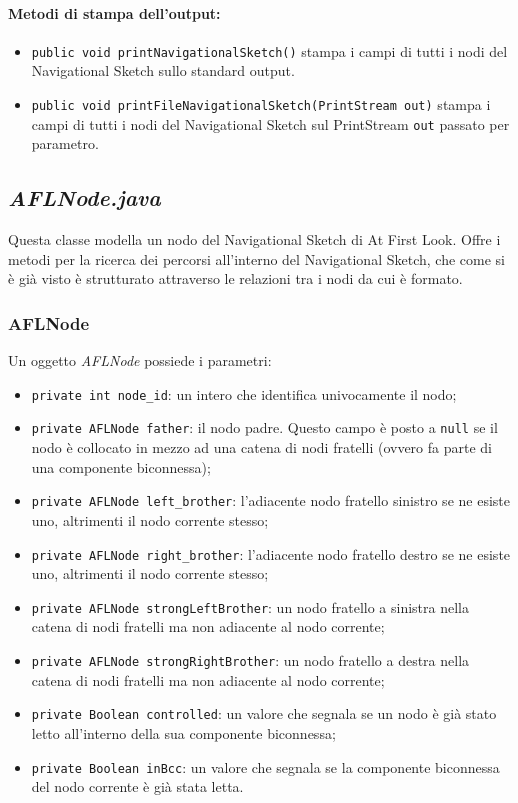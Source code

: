 \documentclass[a4paper,11pt]{report}
\begin{document}
\paragraph{Metodi di stampa dell'output:}
\begin{itemize}
 \item \verb|public void printNavigationalSketch()| stampa i campi di tutti i nodi del Navigational Sketch sullo standard output.
 \item \verb|public void printFileNavigationalSketch(PrintStream out)| stampa i campi di tutti i nodi del Navigational Sketch sul
PrintStream \verb|out| passato per parametro.
\end{itemize}

\subsection{\emph{AFLNode.java}}
Questa classe modella un nodo del Navigational Sketch di At First Look. Offre i metodi per la ricerca dei percorsi all'interno del
Navigational Sketch, che come si è già visto è
strutturato attraverso le relazioni tra i nodi da cui è formato.
\subsubsection{AFLNode}
Un oggetto \emph{AFLNode} possiede i parametri:
\begin{itemize}
 \item \verb|private int node_id|: un intero che identifica univocamente il nodo;
 \item \verb|private AFLNode father|: il nodo padre. Questo campo è posto a \verb|null| se il nodo è collocato in mezzo ad una catena di
nodi fratelli (ovvero fa parte di una componente
biconnessa);
 \item \verb|private AFLNode left_brother|: l'adiacente nodo fratello sinistro se ne esiste uno, altrimenti il nodo corrente stesso;
 \item \verb|private AFLNode right_brother|: l'adiacente nodo fratello destro se ne esiste uno, altrimenti il nodo corrente stesso;
 \item \verb|private AFLNode strongLeftBrother|: un nodo fratello a sinistra nella catena di nodi fratelli ma non adiacente al nodo
corrente;
 \item \verb|private AFLNode strongRightBrother|: un nodo fratello a destra nella catena di nodi fratelli ma non adiacente al nodo corrente;
 \item \verb|private Boolean controlled|: un valore che segnala se un nodo è già stato letto all'interno della sua componente biconnessa;
 \item \verb|private Boolean inBcc|: un valore che segnala se la componente biconnessa del nodo corrente è già stata letta.
\end{itemize}
\end{document}
